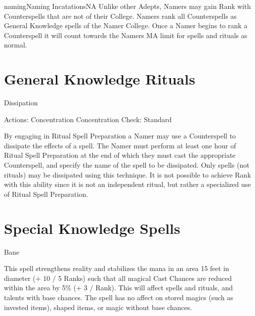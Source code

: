 \begin{College}[2.0]{naming}{Naming Incatations}{NA}
Unlike other Adepts, Namers may gain Rank with Counterspells that are
not of their College. Namers rank all Counterspells as General
Knowledge spells of the Namer College.  Once a Namer begins to rank a
Counterspell it will count towards the Namers MA limit for spells and
rituals as normal.


\section{General Knowledge Rituals}


\begin{ritual}[Q-1]{Dissipation}


Actions: Concentration 
Concentration Check: Standard 
\begin{effects}
By engaging in Ritual Spell Preparation a Namer may use a Counterspell
to dissipate the effects of a spell. The Namer must perform at least
one hour of Ritual Spell Preparation at the end of which they must
cast the appropriate Counterspell, and specify the name of the spell
to be dissipated.  Only spells (not rituals) may be dissipated using
this technique.  It is not possible to achieve Rank with this ability
since it is not an independent ritual, but rather a specialized use of
Ritual Spell Preparation.
\end{effects}
\end{ritual}

\section{Special Knowledge Spells}

\begin{spell}[S-1]{Bane}

\begin{effects}
This spell strengthens reality and stabilizes the mana in an area 15
feet in diameter (+ 10 / 5 Ranks) such that all magical Cast Chances
are reduced within the area by 5\% (+ 3 / Rank).  This will affect
spells and rituals, and talents with base chances.  The spell has no
affect on stored magics (such as invested items), shaped items, or
magic without base chances.
\end{effects}
\end{spell}


\end{College}
